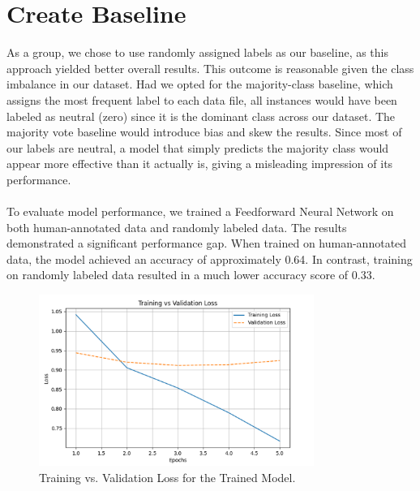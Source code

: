 \documentclass{article}
\begin{document}
\section*{Create Baseline}
As a group, we chose to use randomly assigned labels as our baseline, as this approach yielded better overall 
results. This outcome is reasonable given the class imbalance in our dataset. Had we opted for the majority-class 
baseline, which assigns the most frequent label to each data file, all instances would have been labeled as neutral 
(zero) since it is the dominant class across our dataset. The majority vote baseline would introduce bias and skew 
the results. Since most of our labels are neutral, a model that simply predicts the majority class would appear 
more effective than it actually is, giving a misleading impression of its performance.\\ \\
\noindent
To evaluate model performance, we trained a Feedforward Neural Network on both human-annotated data and randomly labeled data. The results demonstrated a significant performance gap. When trained on human-annotated data, the model achieved an accuracy of approximately 0.64. In contrast, training on randomly labeled data resulted in a much lower accuracy score of 0.33.
\FloatBarrier
\begin{figure}[h]
    \centering
    \includegraphics[width=0.8\textwidth]{model.png}
    \caption{Training vs. Validation Loss for the Trained Model.}
    \label{fig:trained_model}
\end{figure}
\end{document}
